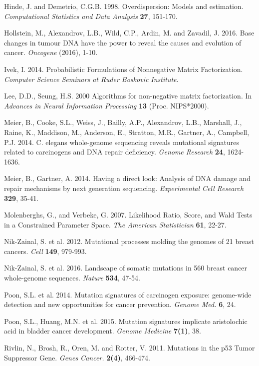 \begin{thebibliography}{1}
 Hinde, J. and Demetrio, C.G.B. 1998. Overdispersion: Models and estimation. \textit{Computational Statistics and Data Analysis} \textbf{27}, 151-170.

 Hollstein, M., Alexandrov, L.B., Wild, C.P., Ardin, M. and Zavadil, J. 2016. Base changes in tumour DNA have the power to reveal the causes and evolution of cancer. \textit{Oncogene} (2016), 1-10.

 Ivek, I. 2014. Probabilistic Formulations of Nonnegative Matrix Factorization. \textit{Computer Science Seminars at Ruder Boskovic Institute}.

 Lee, D.D., Seung, H.S. 2000 Algorithms for non-negative matrix factorization. In \textit{Advances in Neural Information Processing} \textbf{13} (Proc. NIPS*2000).

 Meier, B., Cooke, S.L., Weiss, J., Bailly, A.P., Alexandrov, L.B., Marshall, J., Raine, K., Maddison, M., Anderson, E., Stratton, M.R., Gartner, A., Campbell, P.J. 2014. C. elegans whole-genome sequencing reveals mutational signatures related to carcinogens and DNA repair deficiency. \textit{Genome Research} \textbf{24}, 1624-1636.

 Meier, B., Gartner, A. 2014. Having a direct look: Analysis of DNA damage and repair mechanisms by next generation sequencing. \textit{Experimental Cell Research} \textbf{329}, 35-41.

 Molenberghs, G., and Verbeke, G. 2007. Likelihood Ratio, Score, and Wald Tests in a Constrained Parameter Space. \textit{The American Statistician} \textbf{61}, 22-27.

 Nik-Zainal, S. et al. 2012. Mutational processes molding the genomes of 21 breast cancers. \textit{Cell} \textbf{149}, 979-993.

 Nik-Zainal, S. et al. 2016. Landscape of somatic mutations in 560 breast cancer whole-genome sequences. \textit{Nature} \textbf{534}, 47-54.

 Poon, S.L. et al. 2014. Mutation signatures of carcinogen exposure: genome-wide detection and new opportunities for cancer prevention. \textit{Genome Med.} \textbf{6}, 24.

 Poon, S.L., Huang, M.N. et al. 2015. Mutation signatures implicate aristolochic acid in bladder cancer development. \textit{Genome Medicine} \textbf{7(1)}, 38. 

 Rivlin, N., Brosh, R., Oren, M. and Rotter, V. 2011. Mutations in the p53 Tumor Suppressor Gene. \textit{Genes Cancer.} \textbf{2(4)}, 466-474.


\end{thebibliography}
